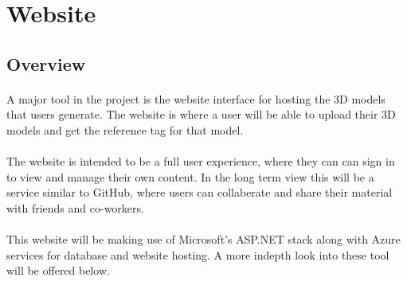  \section{Website}

 \subsection{Overview}
 \paragraph{}
 A major tool in the project is the website interface for hosting the 3D models that users generate.
 The website is where a user will be able to upload their 3D models
 and get the reference tag for that model.
 
 \paragraph{}
 The website is intended to be a full user experience, where they can
 can sign in to view and manage their own content. In the long term view
 this will be a service similar to GitHub, where users can collaberate and share
 their material with friends and co-workers.

\paragraph{}
This website will be making use of Microsoft's ASP.NET stack along with
Azure services for database and website hosting. A more indepth look into 
these tool will be offered below.

